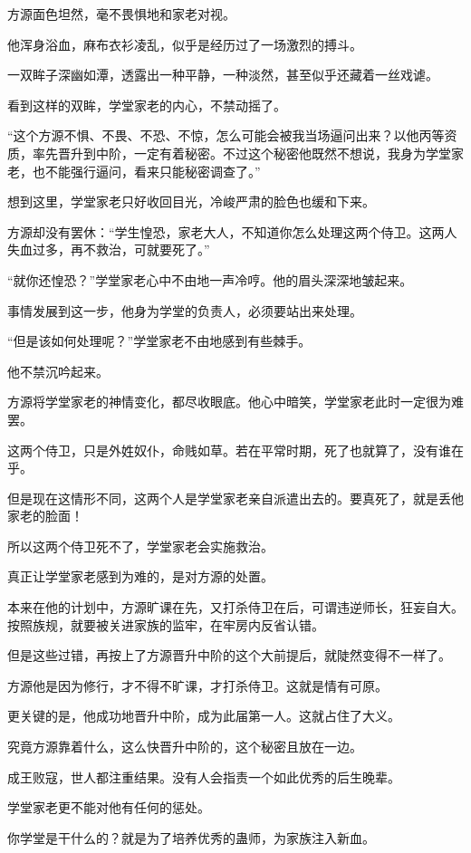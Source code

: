 \begin{this_body}
方源面色坦然，毫不畏惧地和家老对视。

他浑身浴血，麻布衣衫凌乱，似乎是经历过了一场激烈的搏斗。

一双眸子深幽如潭，透露出一种平静，一种淡然，甚至似乎还藏着一丝戏谑。

看到这样的双眸，学堂家老的内心，不禁动摇了。

“这个方源不惧、不畏、不恐、不惊，怎么可能会被我当场逼问出来？以他丙等资质，率先晋升到中阶，一定有着秘密。不过这个秘密他既然不想说，我身为学堂家老，也不能强行逼问，看来只能秘密调查了。”

想到这里，学堂家老只好收回目光，冷峻严肃的脸色也缓和下来。

方源却没有罢休：“学生惶恐，家老大人，不知道你怎么处理这两个侍卫。这两人失血过多，再不救治，可就要死了。”

“就你还惶恐？”学堂家老心中不由地一声冷哼。他的眉头深深地皱起来。

事情发展到这一步，他身为学堂的负责人，必须要站出来处理。

“但是该如何处理呢？”学堂家老不由地感到有些棘手。

他不禁沉吟起来。

方源将学堂家老的神情变化，都尽收眼底。他心中暗笑，学堂家老此时一定很为难罢。

这两个侍卫，只是外姓奴仆，命贱如草。若在平常时期，死了也就算了，没有谁在乎。

但是现在这情形不同，这两个人是学堂家老亲自派遣出去的。要真死了，就是丢他家老的脸面！

所以这两个侍卫死不了，学堂家老会实施救治。

真正让学堂家老感到为难的，是对方源的处置。

本来在他的计划中，方源旷课在先，又打杀侍卫在后，可谓违逆师长，狂妄自大。按照族规，就要被关进家族的监牢，在牢房内反省认错。

但是这些过错，再按上了方源晋升中阶的这个大前提后，就陡然变得不一样了。

方源他是因为修行，才不得不旷课，才打杀侍卫。这就是情有可原。

更关键的是，他成功地晋升中阶，成为此届第一人。这就占住了大义。

究竟方源靠着什么，这么快晋升中阶的，这个秘密且放在一边。

成王败寇，世人都注重结果。没有人会指责一个如此优秀的后生晚辈。

学堂家老更不能对他有任何的惩处。

你学堂是干什么的？就是为了培养优秀的蛊师，为家族注入新血。


\end{this_body}
